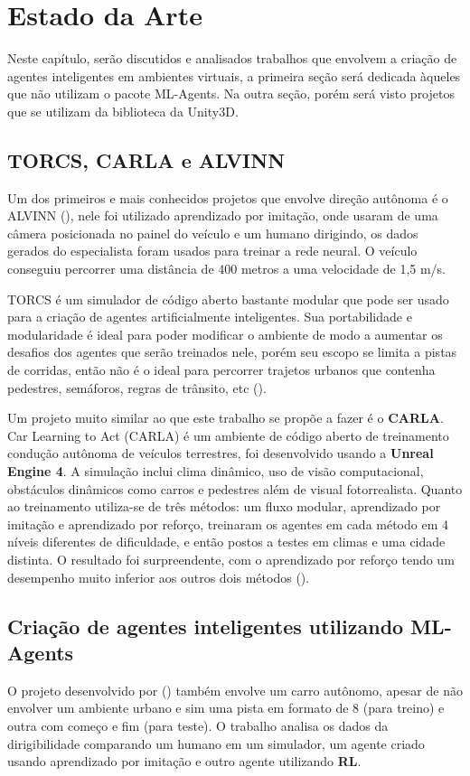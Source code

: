 \chapter{Estado da Arte}\label{cap:estArte}
Neste capítulo, serão discutidos e analisados trabalhos que envolvem a criação de agentes inteligentes em ambientes virtuais, a primeira seção será dedicada àqueles que não utilizam o pacote ML-Agents. Na outra seção, porém será visto projetos que se utilizam da biblioteca da Unity3D.

\section*{TORCS, CARLA e ALVINN}
Um dos primeiros e mais conhecidos projetos que envolve direção autônoma é o ALVINN (), nele foi utilizado aprendizado por imitação, onde usaram de uma câmera posicionada no painel do veículo e um humano dirigindo, os dados gerados do especialista foram usados para treinar a rede neural. O veículo conseguiu percorrer uma distância de 400 metros a uma velocidade de 1,5 m/s. 

TORCS é um simulador de código aberto bastante modular que pode ser usado para a criação de agentes artificialmente inteligentes. Sua portabilidade e modularidade é ideal para poder modificar o ambiente de modo a aumentar os desafios dos agentes que serão treinados nele, porém seu escopo se limita a pistas de corridas, então não é o ideal para percorrer trajetos urbanos que contenha pedestres, semáforos, regras de trânsito, etc ().

Um projeto muito similar ao que este trabalho se propõe a fazer é o \textbf{CARLA}. Car Learning to Act (CARLA) é um ambiente de código aberto de treinamento condução autônoma de veículos terrestres, foi desenvolvido usando a \textbf{Unreal Engine 4}. A simulação inclui clima dinâmico, uso de visão computacional, obstáculos dinâmicos como carros e pedestres além de visual fotorrealista. Quanto ao treinamento utiliza-se de três métodos: um fluxo modular, aprendizado por imitação e aprendizado por reforço, treinaram os agentes em cada método em 4 níveis diferentes de dificuldade, e então postos a testes em climas e uma cidade distinta. O resultado foi surpreendente, com o aprendizado por reforço tendo um desempenho muito inferior aos outros dois métodos ().

\section*{Criação de agentes inteligentes utilizando ML-Agents}\label{sec:primTrab}
O projeto desenvolvido por () também envolve um carro autônomo, apesar de não envolver um ambiente urbano e sim uma pista em formato de 8 (para treino) e outra com começo e fim (para teste). O trabalho analisa os dados da dirigibilidade comparando um humano em um simulador, um agente criado usando aprendizado por imitação e outro agente utilizando \textbf{RL}. 

